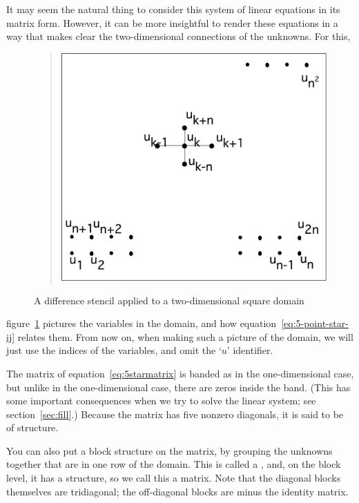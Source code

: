 It may seem the natural thing to consider
this system of linear equations in its matrix form.
However, it can be more insightful to render these equations in a way
that makes clear the two-dimensional connections of the unknowns. For this,
\begin{figure}
  \begin{quote}
    \includegraphics[scale=.11]{graphics/laplacedomain}
  \end{quote}
  \caption{A difference stencil applied to a two-dimensional square
    domain}
  \label{fig:laplacedomain}
\end{figure}
figure~\ref{fig:laplacedomain} pictures the variables in the domain,
and how 
equation~\eqref{eq:5-point-star-ij} relates them. From now on, when
making such a picture of the domain, we will
just use the indices of the variables, and omit the `$u$' identifier.

The matrix of equation~\ref{eq:5starmatrix} is banded as in the
one-dimensional case, but
unlike in the one-dimensional case, there are zeros inside the
band. (This has some important consequences when we try to solve the
linear system; see section~\ref{sec:fill}.) Because the matrix has five
nonzero diagonals, it is said to be of 
structure.

You can also put a block structure on the matrix, by grouping the
unknowns together that are in one row of the domain. This is called a
, and, on the block level, it
has a  structure, so we call this a
 matrix. Note that the diagonal blocks
themselves are tridiagonal; the off-diagonal blocks are
minus the identity matrix.

